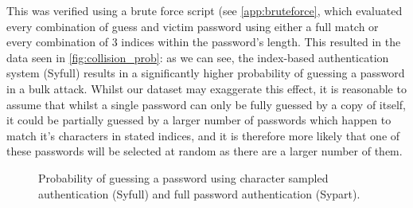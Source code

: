 \documentclass[british,11pt,a4paper]{article}
\begin{document}
This was verified using a brute force script (see \autoref{app:bruteforce}, which evaluated every combination of guess and victim password using either a full match or every combination of 3 indices within the password's length. This resulted in the data seen in \autoref{fig:collision_prob}: as we can see, the index-based authentication system (Syfull) results in a significantly higher probability of guessing a password in a bulk attack. Whilst our dataset may exaggerate this effect, it is reasonable to assume that whilst a single password can only be fully guessed by a copy of itself, it could be partially guessed by a larger number of passwords which happen to match it's characters in stated indices, and it is therefore more likely that one of these passwords will be selected at random as there are a larger number of them. 
\begin{figure}
	\caption{Probability of guessing a password using character sampled authentication (Syfull) and full password authentication (Sypart).}
	\label{fig:collision_prob}
\end{figure}
\end{document}
